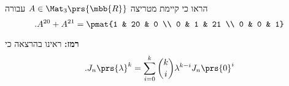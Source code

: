 \documentclass[a4paper,10pt,twoside,openany]{article}
\begin{document}
\begin{exercise}
הראו כי קיימת מטריצה
$A \in \Mat_{3}\prs{\mbb{R}}$
עבורה
\[\text{.} A^{20} + A^{21} = \pmat{1 & 20 & 0 \\ 0 & 1 & 21 \\ 0 & 0 & 1}\]

\textbf{רמז:}
ראינו בהרצאה כי
\[\text{.} J_n\prs{\lambda}^k = \sum_{i = 0}^k \binom{k}{i} \lambda^{k-i} J_n\prs{0}^i\]
\end{exercise}
\end{document}
